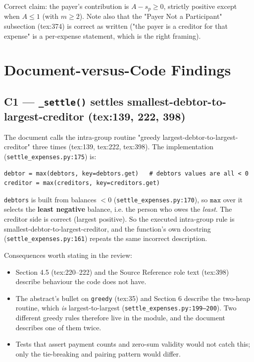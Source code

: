 \documentclass[11pt]{article}
\begin{document}
Correct claim: the payer's contribution is $A - s_p \ge 0$, strictly positive except when $A \le 1$
(with $m \ge 2$). Note also that the "Payer Not a Participant" subsection (tex:374) is correct as written
("the payer is a creditor for that expense" is a per-expense statement, which is the right framing).

\section{Document-versus-Code Findings}

\subsection{C1 --- \texttt{\_settle()} settles smallest-debtor-to-largest-creditor (tex:139, 222, 398)}

The document calls the intra-group routine "greedy largest-debtor-to-largest-creditor" three times
(tex:139, tex:222, tex:398). The implementation (\texttt{settle\_expenses.py:175}) is:

\begin{verbatim}
debtor = max(debtors, key=debtors.get)   # debtors values are all < 0
creditor = max(creditors, key=creditors.get)
\end{verbatim}

\texttt{debtors} is built from balances $< 0$ (\texttt{settle\_expenses.py:170}), so
$\texttt{max}$ over it selects the \textbf{least negative} balance, i.e. the person who owes the
\emph{least}. The creditor side is correct (largest positive). So the executed intra-group rule is
smallest-debtor-to-largest-creditor, and the function's own docstring (\texttt{settle\_expenses.py:161})
repeats the same incorrect description.

Consequences worth stating in the review:

\begin{itemize}
  \item Section 4.5 (tex:220--222) and the Source Reference role text (tex:398) describe behaviour the
code does not have.
  \item The abstract's bullet on \texttt{greedy} (tex:35) and Section 6 describe the two-heap routine,
which \emph{is} largest-to-largest (\texttt{settle\_expenses.py:199--200}). Two different greedy rules
therefore live in the module, and the document describes one of them twice.
  \item Tests that assert payment counts and zero-sum validity would not catch this; only the tie-breaking
and pairing pattern would differ.
\end{itemize}
\end{document}
